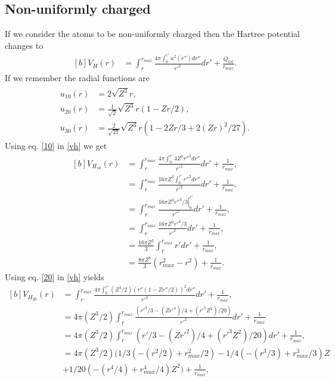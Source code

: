 \documentclass[12pt]{article}
\begin{document}
\subsection{Non-uniformly charged}
If we consider the atoms to be non-uniformly charged then the Hartree potential changes to 
\begin{equation}
    \begin{aligned}[b]
        V_H(r) &=\int^{r_{max}}_r \frac{4\pi \int_0^{r'} u^2(r'')dr''}{r'^2}dr' + \frac{Q_{tot}}{r_{max}}.
    \end{aligned}
    \label{vh}
\end{equation}
If we remember the radial functions are
\begin{eqnarray}
    \begin{aligned}
    u_{10}(r) &= 2\sqrt{Z^3}r,\label{10}\\
    u_{20}(r) &= \frac{1}{\sqrt{2}}\sqrt{Z^3}r(1-Zr/2),\label{20}\\
    u_{30}(r) &= \frac{2}{\sqrt{27}}\sqrt{Z^3}r(1-2Zr/3 + 2(Zr)^2/27). \label{30}
    \end{aligned}
\end{eqnarray}
Using eq. \ref{10} in \ref{vh} we get
\begin{equation}
    \begin{aligned}[b]
     V_{H_{10}}(r)  &=\int^{r_{max}}_r \frac{4\pi \int_0^{r'}4Z^3r''^2dr''}{r'^2}dr' + \frac{1}{r_{max}}, \\
     &=\int^{r_{max}}_r \frac{16\pi Z^3 \int_0^{r'}r''^2dr''}{r'^2}dr' + \frac{1}{r_{max}},\\
     &=\int^{r_{max}}_r \frac{16\pi Z^3 \left.r''^3/3\right|_0^{r'}}{r'^2}dr' + \frac{1}{r_{max}},\\
     &=\int^{r_{max}}_r \frac{16\pi Z^3 r'^3/3}{r'^2}dr' + \frac{1}{r_{max}},\\
     &= \frac{16\pi Z^3}{3}\int^{r_{max}}_r  r'dr' + \frac{1}{r_{max}},\\
     &= \frac{8\pi Z^3}{3}(r^2_{max} - r^2) + \frac{1}{r_{max}}.
    \end{aligned}
\end{equation}
Using eq. \ref{20} in \ref{vh} yields
\begin{equation}
    \begin{aligned}[b]
     V_{H_{20}}(r)  &=\int^{r_{max}}_r \frac{4\pi \int_0^{r'}(Z^3/2)(r''(1 - Zr''/2))^2dr''}{r'^2}dr' + \frac{1}{r_{max}},  \\
     &=4\pi(Z^3/2)\int^{r_{max}}_r \frac{(r'^3/3-(Zr'^4 )/4+(r'^5 Z^2)/20)}{r'^2}dr' + \frac{1}{r_{max}}\\
     &=4\pi(Z^3/2)\int^{r_{max}}_r (r'/3-(Zr'^2 )/4+(r'^3 Z^2)/20)dr' + \frac{1}{r_{max}},\\
     &=4\pi(Z^3/2)(1/3 (-(r^2/2)+r_{max}^2/2)-1/4 (-(r^3/3)+r_{max}^3/3) Z\\
     &+ 1/20 (-(r^4/4)+r_{max}^4/4) Z^2) + \frac{1}{r_{max}},
    \end{aligned}
\end{equation}
\end{document}
